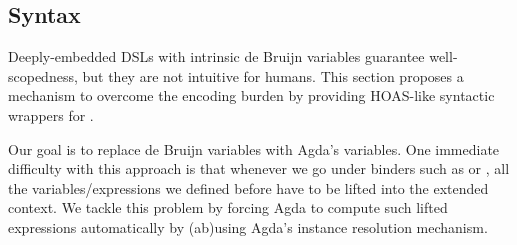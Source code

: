 \subsection{Syntax}
Deeply-embedded DSLs with intrinsic de Bruijn variables guarantee well-scopedness,
but they are not intuitive for humans.  This section proposes a mechanism
to overcome the encoding burden by providing HOAS-like syntactic wrappers for
.

Our goal is to replace de Bruijn variables with Agda's variables.  One immediate
difficulty with this approach is that whenever we go under binders such as 
 or , all the variables/expressions we defined before have to be
lifted into the extended context.  We tackle this problem by forcing Agda to
compute such lifted expressions automatically by (ab)using Agda's
instance resolution mechanism.

